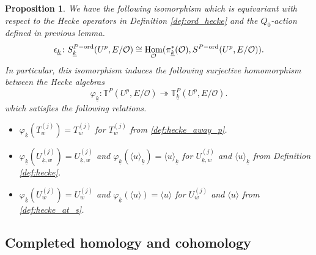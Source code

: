 \documentclass[leqno]{amsart}
\newtheorem{prop}[thm]{Proposition}
\theoremstyle{definition}
\theoremstyle{remark}
\newcommand{\oo}{\mathcal{O}}
\DeclareMathOperator{\Hom}{Hom}
\newcommand{\wt}[1]{\underline{ #1 }}
\newcommand{\TT}{\mathbb{T}} %
\newcommand{\ord}{\textnormal{ord}} %
\begin{document}
\begin{prop}\label{prop:wt_indep}
	We have the following isomorphism
	which is equivariant with respect to the 
	Hecke operators in Definition \ref{def:ord_hecke}
    and the $Q_0$-action  defined in previous lemma.
	\[
		\epsilon_{\wt{k}} \colon 
		S_{\wt{k}}^{P-\ord}(U^p,E/\oo)\cong 
		\Hom_{\oo}(\pi_{\wt{k}}^*(\oo),
		S^{P-\ord}(U^p,E/\oo)).
	\]
	In particular, this isomorphism 
	induces the following surjective homomorphism
	between the Hecke algebras
	\[
		\varphi_{\wt{k}}\colon 
		\TT^P(U^p,E/\oo)\twoheadrightarrow
		\TT^P_{\wt{k}}(U^p,E/\oo).
	\]
    which satisfies the following relations.
    \begin{itemize}
    \item $\varphi_{\wt{k}}(T_w^{(j)})=T_w^{(j)}$ for $T_w^{(j)}$
    from \eqref{def:hecke_away_p}.
    \item $\varphi_{\wt{k}}(U_{\wt{k},w}^{(j)})=U_{\wt{k},w}^{(j)}$ 
    and  $\varphi_{\wt{k}}(\langle u\rangle_{\wt{k}})=
    \langle u\rangle_{\wt{k}}$ 
    for $U_{\wt{k},w}^{(j)}$ and $\langle u\rangle_{\wt{k}}$
    from Definition \eqref{def:hecke}.
    \item $\varphi_{\wt{k}}(U_{w}^{(j)})=U_{w}^{(j)}$ 
    and  $\varphi_{\wt{k}}(\langle u\rangle)=
    \langle u\rangle$  
    for $U_{w}^{(j)}$ and $\langle u\rangle$
    from \eqref{def:hecke_at_s}.
    \end{itemize}
\end{prop}


\subsection{Completed homology and cohomology}
\end{document}
